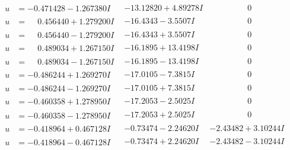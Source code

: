\documentclass[1p]{elsarticle_modified}
\theoremstyle{definition}
\begin{document}
$$\begin{array}{c|c|c}
\begin{aligned}
u &= -0.471428 - 1.267380 I\end{aligned}
 & -13.12820 + 4.89278 I & \phantom{-0.000000 } 0 \\ \hline\begin{aligned}
u &= \phantom{-}0.456440 + 1.279200 I\end{aligned}
 & -16.4343 - 3.5507 I & \phantom{-0.000000 } 0 \\ \hline\begin{aligned}
u &= \phantom{-}0.456440 - 1.279200 I\end{aligned}
 & -16.4343 + 3.5507 I & \phantom{-0.000000 } 0 \\ \hline\begin{aligned}
u &= \phantom{-}0.489034 + 1.267150 I\end{aligned}
 & -16.1895 + 13.4198 I & \phantom{-0.000000 } 0 \\ \hline\begin{aligned}
u &= \phantom{-}0.489034 - 1.267150 I\end{aligned}
 & -16.1895 - 13.4198 I & \phantom{-0.000000 } 0 \\ \hline\begin{aligned}
u &= -0.486244 + 1.269270 I\end{aligned}
 & -17.0105 - 7.3815 I & \phantom{-0.000000 } 0 \\ \hline\begin{aligned}
u &= -0.486244 - 1.269270 I\end{aligned}
 & -17.0105 + 7.3815 I & \phantom{-0.000000 } 0 \\ \hline\begin{aligned}
u &= -0.460358 + 1.278950 I\end{aligned}
 & -17.2053 - 2.5025 I & \phantom{-0.000000 } 0 \\ \hline\begin{aligned}
u &= -0.460358 - 1.278950 I\end{aligned}
 & -17.2053 + 2.5025 I & \phantom{-0.000000 } 0 \\ \hline\begin{aligned}
u &= -0.418964 + 0.467128 I\end{aligned}
 & -0.73474 - 2.24620 I & -2.43482 + 3.10244 I \\ \hline\begin{aligned}
u &= -0.418964 - 0.467128 I\end{aligned}
 & -0.73474 + 2.24620 I & -2.43482 - 3.10244 I \\ \hline\begin{aligned}

\end{aligned}
\end{array}$$
\end{document}
